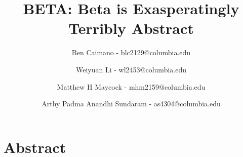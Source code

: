 \documentclass[10pt]{article}
\title{BETA: Beta is Exasperatingly Terribly Abstract}
\author{
	Ben Caimano - blc2129@columbia.edu
	\and
	Weiyuan Li - wl2453@columbia.edu
	\and
	Matthew H Maycock - mhm2159@columbia.edu
	\and
	Arthy Padma Anandhi Sundaram - as4304@columbia.edu
}
\date{}
\begin{document}
\maketitle
\section*{Abstract}
\end{document}
